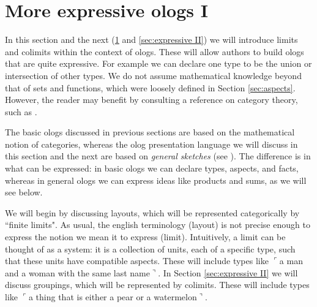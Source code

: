 \documentclass{amsart}
\newcommand{\fakebox}[1]{\tn{$\ulcorner$#1$\urcorner$}}
\newcommand{\comment}[1]{}
\theoremstyle{remark}
\theoremstyle{definition}
\def\tn{\textnormal}
\begin{document}
\section{More expressive ologs I}\label{sec:expressive I}

In this section and the next (\ref{sec:expressive I} and \ref{sec:expressive II}) we will introduce limits and colimits within the context of ologs. These will allow authors to build ologs that are quite expressive. For example we can declare one type to be the union or intersection of other types. We do not assume mathematical knowledge beyond that of sets and functions, which were loosely defined in Section \ref{sec:aspects}. However, the reader may benefit by consulting a reference on category theory, such as \cite{Awo}.

The basic ologs discussed in previous sections are based on the mathematical notion of categories, whereas the olog presentation language we will discuss in this section and the next are based on {\em general sketches} (see \cite{Mak}). The difference is in what can be expressed: in basic ologs we can declare types, aspects, and facts, whereas in general ologs we can express ideas like products and sums, as we will see below. 

\comment{%
Many ideas can be expressed using only basic ologs, and when this is possible it is preferred. Many more ideas can be expressed with the addition of only ``layouts" (corresponding to {\em finite limit sketches}), and again an author who can restrict himself or herself to this language will benefit for it. The reason is that when authors use a richer olog presentation language, the ability to compare different ologs becomes harder in two ways. First, it becomes harder to make meaningful connections (functors or sketch-maps) between different ologs, and second the set of theorems available for transferring instance data (see Section \ref{sec:instance data}) from one olog to the other becomes restricted. 
}%

We will begin by discussing layouts, which will be represented categorically by ``finite limits". As usual, the english terminology (layout) is not precise enough to express the notion we mean it to express (limit). Intuitively, a limit can be thought of as a system: it is a collection of units, each of a specific type, such that these units have compatible aspects. These will include types like \fakebox{a man and a woman with the same last name}. In Section \ref{sec:expressive II} we will discuss groupings, which will be represented by colimits. These will include types like \fakebox{a thing that is either a pear or a watermelon}. 
\end{document}

